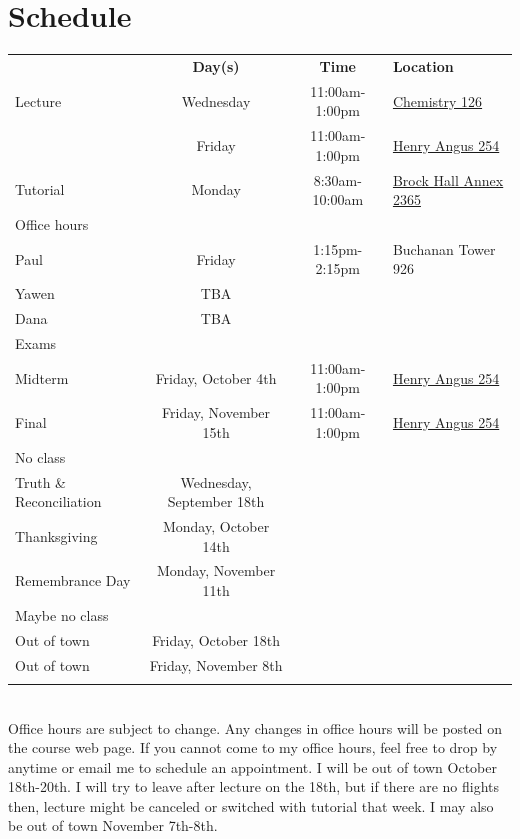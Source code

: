 \documentclass[10pt]{article}
\begin{document}
\section{Schedule}
\begin{tabular}{l c c l}
  \hline 
  & \textbf{Day(s)} & \textbf{Time} & \textbf{Location} \\
  Lecture & Wednesday & 11:00am-1:00pm & \href{https://ssc.adm.ubc.ca/classroomservices/function/viewlocation?userEvent=ShowLocation&buildingID=CHEM&roomID=C126}{Chemistry 126} \\
  & Friday & 11:00am-1:00pm &
  \href{https://ssc.adm.ubc.ca/classroomservices/function/viewlocation?userEvent=ShowLocation&buildingID=ANGU&roomID=254}
  {Henry Angus 254} 
  \\
  Tutorial & Monday & 8:30am-10:00am &
  \href{https://ssc.adm.ubc.ca/classroomservices/function/viewlocation?userEvent=ShowLocation&buildingID=BRKX&roomID=2365}
  {Brock Hall Annex 2365}  \\
  Office hours \\
  \; Paul & Friday & 1:15pm-2:15pm & Buchanan Tower 926 \\
  \; Yawen & TBA & & \\ 
  \; Dana & TBA & & \\ \hline
  Exams \\
  \; Midterm & Friday, October 4th & 11:00am-1:00pm &  \href{https://ssc.adm.ubc.ca/classroomservices/function/viewlocation?userEvent=ShowLocation&buildingID=ANGU&roomID=254}
  {Henry Angus 254} \\
  \; Final & Friday, November 15th & 11:00am-1:00pm &   \href{https://ssc.adm.ubc.ca/classroomservices/function/viewlocation?userEvent=ShowLocation&buildingID=ANGU&roomID=254}
  {Henry Angus 254}  \\
  No class \\
  \; Truth \& Reconciliation  & Wednesday, September 18th \\
  \; Thanksgiving & Monday, October 14th \\
  \; Remembrance Day & Monday, November 11th \\
  Maybe no class \\
  \; Out of town & Friday, October 18th \\  
  \; Out of town & Friday, November 8th \\
  \\ \hline 
\end{tabular} \\
Office hours are subject to change. Any changes in office hours will
be posted on the course web page. If you cannot come to my office
hours, feel free to drop by anytime or email me to schedule an
appointment.  I will be out of town October 18th-20th. I will try to
leave after lecture on the 18th, but if there are no flights then,
lecture might be canceled or switched with tutorial that week. I may
also be out of town November 7th-8th. 
\end{document}
